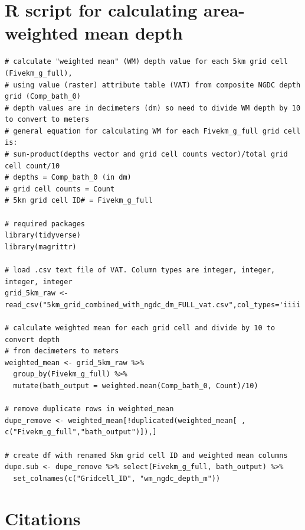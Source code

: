 \documentclass[
]{article}
\begin{document}
\hypertarget{r-script-for-calculating-area-weighted-mean-depth}{%
\section{R script for calculating area-weighted mean
depth}\label{r-script-for-calculating-area-weighted-mean-depth}}

\begin{verbatim}
# calculate "weighted mean" (WM) depth value for each 5km grid cell (Fivekm_g_full),
# using value (raster) attribute table (VAT) from composite NGDC depth grid (Comp_bath_0)
# depth values are in decimeters (dm) so need to divide WM depth by 10 to convert to meters
# general equation for calculating WM for each Fivekm_g_full grid cell is:
# sum-product(depths vector and grid cell counts vector)/total grid cell count/10
# depths = Comp_bath_0 (in dm)
# grid cell counts = Count
# 5km grid cell ID# = Fivekm_g_full

# required packages
library(tidyverse)
library(magrittr)

# load .csv text file of VAT. Column types are integer, integer, integer, integer
grid_5km_raw <- read_csv("5km_grid_combined_with_ngdc_dm_FULL_vat.csv",col_types='iiii')

# calculate weighted mean for each grid cell and divide by 10 to convert depth
# from decimeters to meters
weighted_mean <- grid_5km_raw %>%
  group_by(Fivekm_g_full) %>% 
  mutate(bath_output = weighted.mean(Comp_bath_0, Count)/10)

# remove duplicate rows in weighted_mean
dupe_remove <- weighted_mean[!duplicated(weighted_mean[ , c("Fivekm_g_full","bath_output")]),]

# create df with renamed 5km grid cell ID and weighted mean columns
dupe.sub <- dupe_remove %>% select(Fivekm_g_full, bath_output) %>%
  set_colnames(c("Gridcell_ID", "wm_ngdc_depth_m"))
\end{verbatim}

\clearpage

\hypertarget{citations}{%
\section*{Citations}\label{citations}}
\end{document}
